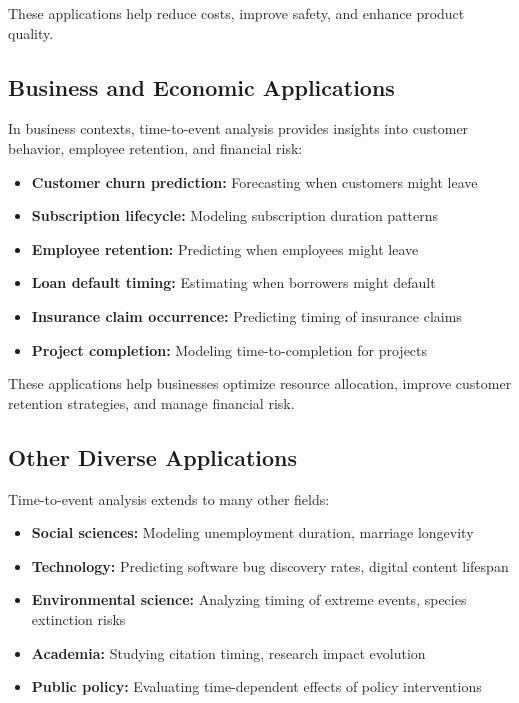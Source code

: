 These applications help reduce costs, improve safety, and enhance product quality.

\subsection{Business and Economic Applications}

In business contexts, time-to-event analysis provides insights into customer behavior, employee retention, and financial risk:

\begin{itemize}
\item \textbf{Customer churn prediction:} Forecasting when customers might leave
\item \textbf{Subscription lifecycle:} Modeling subscription duration patterns
\item \textbf{Employee retention:} Predicting when employees might leave
\item \textbf{Loan default timing:} Estimating when borrowers might default
\item \textbf{Insurance claim occurrence:} Predicting timing of insurance claims
\item \textbf{Project completion:} Modeling time-to-completion for projects
\end{itemize}

These applications help businesses optimize resource allocation, improve customer retention strategies, and manage financial risk.

\subsection{Other Diverse Applications}

Time-to-event analysis extends to many other fields:

\begin{itemize}
\item \textbf{Social sciences:} Modeling unemployment duration, marriage longevity
\item \textbf{Technology:} Predicting software bug discovery rates, digital content lifespan
\item \textbf{Environmental science:} Analyzing timing of extreme events, species extinction risks
\item \textbf{Academia:} Studying citation timing, research impact evolution
\item \textbf{Public policy:} Evaluating time-dependent effects of policy interventions
\end{itemize}

